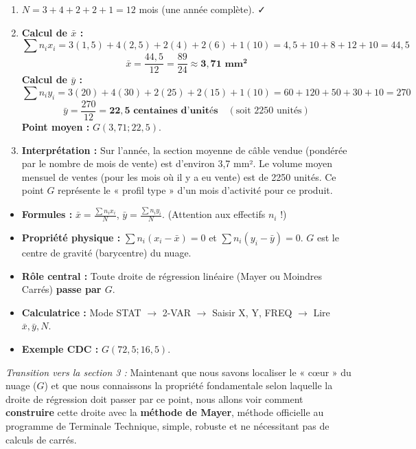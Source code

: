 \documentclass[11pt]{article}
\newcounter{popsec}
\newcounter{popsub}
\newcommand{\courssub}[1]{%
  \stepcounter{popsub}%
  \par\vspace{9pt}\noindent{\popxbold\fontsize{11.5}{13}\selectfont\color{popink}{\color{poporange}\thepopsec.\thepopsub}\hspace{6pt}#1}\par\nopagebreak\vspace{4pt}
}
\begin{document}
\begin{corrige}
\begin{enumerate}
\item $N = 3 + 4 + 2 + 2 + 1 = 12$ mois (une année complète). ✓
\item \textbf{Calcul de $\bar{x}$ :}
      \[
      \sum n_i x_i = 3(1,5) + 4(2,5) + 2(4) + 2(6) + 1(10) = 4,5 + 10 + 8 + 12 + 10 = 44,5
      \]
      \[
      \bar{x} = \frac{44,5}{12} = \frac{89}{24} \approx \mathbf{3,71 \text{ mm}^2}
      \]
      \textbf{Calcul de $\bar{y}$ :}
      \[
      \sum n_i y_i = 3(20) + 4(30) + 2(25) + 2(15) + 1(10) = 60 + 120 + 50 + 30 + 10 = 270
      \]
      \[
      \bar{y} = \frac{270}{12} = \mathbf{22,5 \text{ centaines d'unités}} \quad (\text{soit } 2250 \text{ unités})
      \]
      \textbf{Point moyen :} $G(3,71 ; 22,5)$.
\item \textbf{Interprétation :} Sur l'année, la section moyenne de câble vendue (pondérée par le nombre de mois de vente) est d'environ 3,7 mm². Le volume moyen mensuel de ventes (pour les mois où il y a eu vente) est de 2250 unités. Ce point $G$ représente le « profil type » d'un mois d'activité pour ce produit.
\end{enumerate}
\end{corrige}

\courssub{Synthèse de la section}

\begin{aretenir}
\begin{itemize}
\item \textbf{Formules :} $\bar{x} = \frac{\sum n_i x_i}{N}$, $\bar{y} = \frac{\sum n_i y_i}{N}$. (Attention aux effectifs $n_i$ !)
\item \textbf{Propriété physique :} $\sum n_i(x_i - \bar{x}) = 0$ et $\sum n_i(y_i - \bar{y}) = 0$. $G$ est le centre de gravité (barycentre) du nuage.
\item \textbf{Rôle central :} Toute droite de régression linéaire (Mayer ou Moindres Carrés) \textbf{passe par $G$}.
\item \textbf{Calculatrice :} Mode STAT $\to$ 2-VAR $\to$ Saisir X, Y, FREQ $\to$ Lire $\bar{x}, \bar{y}, N$.
\item \textbf{Exemple CDC :} $G(72,5 ; 16,5)$.
\end{itemize}
\end{aretenir}

\emph{Transition vers la section 3 :} Maintenant que nous savons localiser le « cœur » du nuage ($G$) et que nous connaissons la propriété fondamentale selon laquelle la droite de régression doit passer par ce point, nous allons voir comment \textbf{construire} cette droite avec la \textbf{méthode de Mayer}, méthode officielle au programme de Terminale Technique, simple, robuste et ne nécessitant pas de calculs de carrés.
\end{document}
